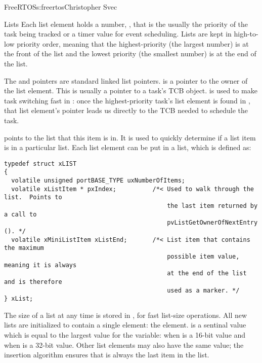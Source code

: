 \begin{aosachapter}{FreeRTOS}{s:freertos}{Christopher Svec}
\begin{aosasect1}{Lists}
Each list element holds a number, , that is the
usually the priority of the task being tracked or a timer value for
event scheduling.  Lists are kept in high-to-low priority order,
meaning that the highest-priority  (the largest number) is
at the front of the list and the lowest priority  (the
smallest number) is at the end of the list.

The  and  pointers are standard linked
list pointers.   is a pointer to the owner of the list element. This is
usually a pointer to a task's TCB object.  is used to
make task switching fast in : once the
highest-priority task's list element is found in
, that list element's  pointer
leads us directly to the TCB needed to schedule the task.

 points to the list that this item is in. It is used
to quickly determine if a list item is in a particular list.  Each
list element can be put in a list, which is defined as:

\begin{verbatim}
typedef struct xLIST
{
  volatile unsigned portBASE_TYPE uxNumberOfItems;
  volatile xListItem * pxIndex;          /*< Used to walk through the list.  Points to
                                             the last item returned by a call to 
                                             pvListGetOwnerOfNextEntry (). */
  volatile xMiniListItem xListEnd;       /*< List item that contains the maximum 
                                             possible item value, meaning it is always
                                             at the end of the list and is therefore 
                                             used as a marker. */
} xList;
\end{verbatim}

The size of a list at any time is stored in , for
fast list-size operations.
All new lists are initialized to contain a single element: the
 element.   is a sentinal
value which is equal to the largest value for the 
variable:  when  is a 16-bit value and
 when  is a 32-bit value. Other list
elements may also have the same value; the insertion algorithm ensures
that  is always the last item in the list.
 

\end{aosasect1}
\end{aosachapter}
